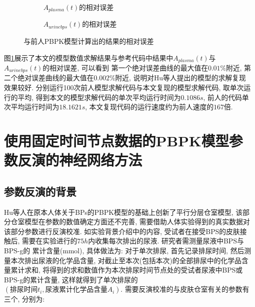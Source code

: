 \documentclass[a4paper,punct=banjiao,twoside]{ctexrep}
\theoremstyle{plain}
\theoremstyle{definition}
\theoremstyle{remark}
\begin{document}
\begin{figure}[H]
  \centering
  \begin{subfigure}{0.49\textwidth}
    \centering
    \resizebox{1.13\textwidth}{!}{}
    \caption{$A_{plasma}(t)$的相对误差}
  \end{subfigure}
  \begin{subfigure}{0.495\textwidth}
    \centering
    \resizebox{1.15\textwidth}{!}{}
    \caption{$A_{urinebps}(t)$的相对误差}
  \end{subfigure}
  \caption{与前人PBPK模型计算出的结果的相对误差}
  \label{PBPK模型结果对比}
\end{figure}


图\ref{PBPK模型结果对比}展示了本文的模型数值求解结果与参考代码\cite{12}中结果中$A_{plasma}(t)$与$A_{urinebps}(t)$的相对误差, 可以看到
第一个绝对误差曲线的最大值在$0.01\%$附近, 第二个绝对误差曲线的最大值在$0.002\%$附近, 说明对Hu等人\cite{11}提出的模型的求解复现效果较好.
分别运行100次前人模型求解代码与本文复现的模型求解代码, 取单次运行的平均, 得到本文的模型求解代码的单次平均运行时间为$0.1086s$, 前人的代码单次平均运行时间为$18.1621s$,
本文复现代码的运行速度约为前人速度的$167$倍.


\chapter{使用固定时间节点数据的PBPK模型参数反演的神经网络方法}
\section{参数反演的背景}

Hu等人\cite{11}在原本人体关于BPs的PBPK模型的基础上创新了平行分层仓室模型, 该部分仓室模型在参数的数值确定方面还不完善, 需要借助人体实验得到的真实数据对
该部分参数进行反演校准. 如实验背景介绍中的内容, 受试者在接受BPS的皮肤接触后, 需要在实验进行的$75h$内收集每次排出的尿液. 研究者需测量尿液中BPS与BPS-g的
累计含量(mmol), 具体做法为: 对于单次排尿, 首先记录排尿时间, 然后测量本次排出尿液的化学品含量, 对截止至本次(包括本次)的全部排尿中的化学品含量累计求和, 
将得到的求和数值作为本次排尿时间节点处的受试者尿液中BPS或BPS-g的累计含量, 这样就得到了单次排尿的$(\textit{排尿时间}t_i, \textit{尿液累计化学品含量}A_i)$. 
需要反演校准的与皮肤仓室有关的参数有三个, 分别为:
\end{document}
